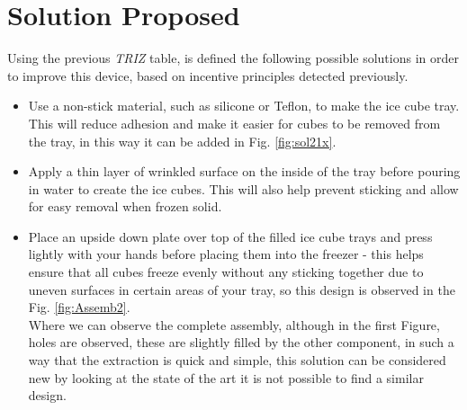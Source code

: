 \documentclass[12pt, twoside]{report}
\begin{document}
\section{Solution Proposed}
Using the previous \textit{TRIZ} table, is defined the following possible solutions in order to improve this device, based on incentive principles detected previously.
\begin{itemize}
    \item Use a non-stick material, such as silicone or Teflon, to make the ice cube tray. This will reduce adhesion and make it easier for cubes to be removed from the tray, in this way it can be added in Fig. \ref{fig:sol21x}.
    \item Apply a thin layer of wrinkled surface on the inside of the tray before pouring in water to create the ice cubes. This will also help prevent sticking and allow for easy removal when frozen solid.
    \item Place an upside down plate over top of the filled ice cube trays and press lightly with your hands before placing them into the freezer - this helps ensure that all cubes freeze evenly without any sticking together due to uneven surfaces in certain areas of your tray, so this design is observed in the Fig. \ref{fig:Assemb2}.\\
    Where we can observe the complete assembly, although in the first Figure, holes are observed, these are slightly filled by the other component, in such a way that the extraction is quick and simple, this solution can be considered new by looking at the state of the art it is not possible to find a similar design. 
\end{itemize}
\end{document}
